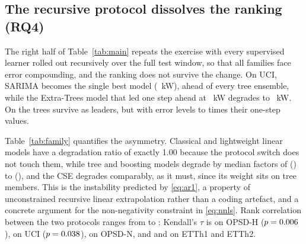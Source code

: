 \documentclass[journal]{IEEEtran}
\begin{document}
\subsection{The recursive protocol dissolves the ranking (RQ4)}
\label{sec:recursive}
The right half of Table~\ref{tab:main} repeats the exercise with every supervised learner rolled out recursively over the full test window, so that all families face error compounding, and the ranking does not survive the change. On UCI, SARIMA becomes the single best model (\bestRecUCIVal~kW), ahead of every tree ensemble, while the Extra-Trees model that led one step ahead at \bestOneUCIVal~kW degrades to \etRecUCI~kW. \recOPSDHSentence{} On \recTreeLeaderList{} the trees survive as leaders, but with error levels \treeLeadRecDegMin{} to \treeLeadRecDegMax{} times their one-step values.

Table~\ref{tab:family} quantifies the asymmetry. Classical and lightweight linear models have a degradation ratio of exactly 1.00 because the protocol switch does not touch them, while tree and boosting models degrade by median factors of \treeDegMin{} (\treeDegMinDs) to \treeDegMax{} (\treeDegMaxDs), and the CSE degrades comparably, as it must, since its weight sits on tree members. \ridgeDivergeSentence{} This is the instability predicted by \eqref{eq:ar1}, a property of unconstrained recursive linear extrapolation rather than a coding artefact, and a concrete argument for the non-negativity constraint in \eqref{eq:nnls}. Rank correlation between the two protocols ranges from \tauMin{} to \tauMax: Kendall's $\tau$ is \tauOPSDDEhousehold{} on OPSD-H ($p = 0.006$), \tauUCI{} on UCI ($p = 0.038$), \tauOPSDDEtotal{} on OPSD-N, and \tauETThOne{} and \tauETThTwo{} on ETTh1 and ETTh2. \tauOPSDHSentence

\begin{table}[!t]
\caption{Top: median ratio of recursive to one-step RMSE by family on the fixed split, excluding the \nDiverged{} divergent regularised linear runs. Middle and bottom: rolling-origin mean rank by horizon, by model and by family, over five datasets with 24 origins each and the \nRollingModels{} models present on all five. Lower is better.}
\label{tab:family}
\centering
\scriptsize
\setlength{\tabcolsep}{3pt}

\end{table}

\begin{table}[!t]
\caption{CSE weights, the exact solution of \eqref{eq:nnls} on the validation slice of each series. Exact zeros in bold. Tree members are LightGBM, CatBoost and Extra-Trees. The mass row is rounded to three decimals; on OPSD-N it is \massOPSDN{} before rounding because SARIMA carries weight \wSarimaOPSDNsci.}
\label{tab:weights}
\centering
\footnotesize
\setlength{\tabcolsep}{4pt}

\end{table}
\end{document}
